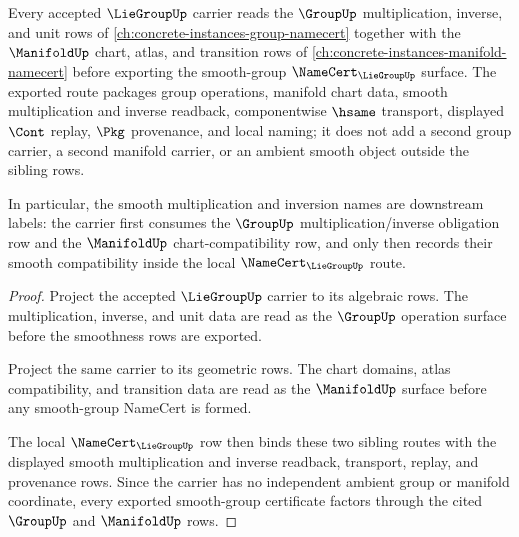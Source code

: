 \begin{theorem}
\label{thm:lie-group-manifold-group-sibling-route}
Every accepted $\LieGroupUp$ carrier reads the $\GroupUp$ multiplication, inverse, and unit rows of \autoref{ch:concrete-instances-group-namecert} together with the $\ManifoldUp$ chart, atlas, and transition rows of \autoref{ch:concrete-instances-manifold-namecert} before exporting the smooth-group $\NameCert_{\LieGroupUp}$ surface. The exported route packages group operations, manifold chart data, smooth multiplication and inverse readback, componentwise $\hsame$ transport, displayed $\Cont$ replay, $\Pkg$ provenance, and local naming; it does not add a second group carrier, a second manifold carrier, or an ambient smooth object outside the sibling rows.

In particular, the smooth multiplication and inversion names are downstream labels: the carrier first consumes the $\GroupUp$ multiplication/inverse obligation row and the $\ManifoldUp$ chart-compatibility row, and only then records their smooth compatibility inside the local $\NameCert_{\LieGroupUp}$ route.
\end{theorem}
\begin{proof}
Project the accepted $\LieGroupUp$ carrier to its algebraic rows. The multiplication, inverse, and unit data are read as the $\GroupUp$ operation surface before the smoothness rows are exported.

Project the same carrier to its geometric rows. The chart domains, atlas compatibility, and transition data are read as the $\ManifoldUp$ surface before any smooth-group NameCert is formed.

The local $\NameCert_{\LieGroupUp}$ row then binds these two sibling routes with the displayed smooth multiplication and inverse readback, transport, replay, and provenance rows. Since the carrier has no independent ambient group or manifold coordinate, every exported smooth-group certificate factors through the cited $\GroupUp$ and $\ManifoldUp$ rows.
\end{proof}
